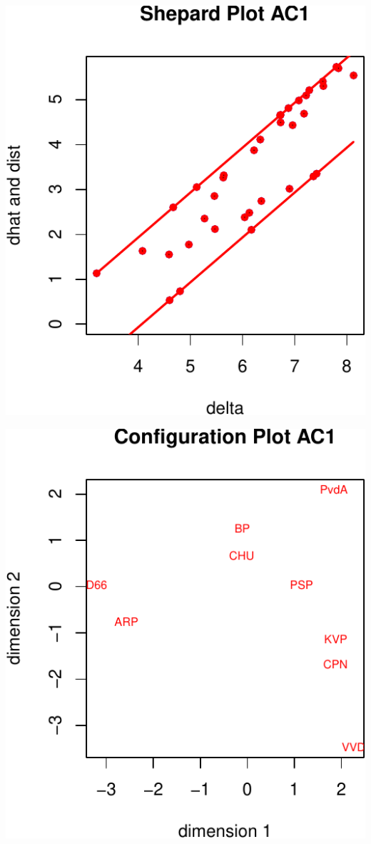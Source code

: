 \documentclass[
  12pt,
]{article}
\begin{document}
\begin{center}\includegraphics{smacofAC_files/figure-latex/gruijterh11-1} \end{center}

\begin{center}\includegraphics{smacofAC_files/figure-latex/gruijterh11-2} \end{center}
\end{document}
